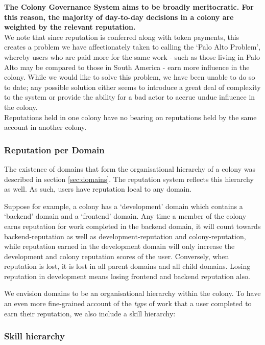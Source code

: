 \textbf{The Colony Governance System aims to be broadly meritocratic. For this reason, the majority of day-to-day decisions in a colony are weighted by the relevant reputation.}\\ %

We note that since reputation is conferred along with token payments, this creates a problem we have affectionately taken to calling the `Palo Alto Problem', whereby users who are paid more for the same work - such as those living in Palo Alto may be compared to those in South America - earn more influence in the colony. While we would like to solve this problem, we have been unable to do so to date; any possible solution either seems to introduce a great deal of complexity to the system or provide the ability for a bad actor to accrue undue influence in the colony.\\
%

Reputations held in one colony have no bearing on reputations held by the same account in another colony.
%
%
\subsubsection{Reputation per Domain}\label{sec:rep-by-domain}
The existence of domains that form the organisational hierarchy of a colony was described in section \ref{sec:domains}. The reputation system reflects this hierarchy as well. As such, users have reputation local to any domain.

Suppose for example, a colony has a `development' domain which contains a `backend' domain and a `frontend' domain. Any time a member of the colony earns reputation for work completed in the backend domain, it will count towards backend-reputation as well as development-reputation and colony-reputation, while reputation earned in the development domain will only increase the development and colony reputation scores of the user. Conversely, when reputation is lost, it is lost in all parent domains and all child domains. Losing reputation in development means losing frontend and backend reputation also. 

We envision domains to be an organisational hierarchy within the colony. To have an even more fine-grained account of the \emph{type} of work that a user completed to earn their reputation, we also include a skill hierarchy:

\subsubsection{Skill hierarchy}\label{sec:rep-by-skill}

